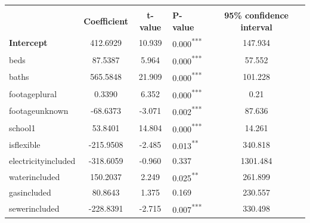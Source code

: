 \documentclass[12pt]{report}
\begin{document}
\renewcommand{\arraystretch}{0.5}
\begin{table}[H]
	\centering
	\begin{tabular}{l S[table-format=5.4] S[table-format=4.4] l S[table-format=4.4]}
		\toprule \\
		                                                 & \textbf{Coefficient} & \textbf{t-value} & \textbf{P-value}           & \textbf{95\% confidence interval} \\ \midrule
		\textbf{Intercept}                               & 412.6929             & 10.939           & 0.000\textsuperscript{***} & 147.934                           \\
		beds                                             & 87.5387              & 5.964            & 0.000\textsuperscript{***} & 57.552                            \\
		baths                                            & 565.5848             & 21.909           & 0.000\textsuperscript{***} & 101.228                           \\
		footageplural                                    & 0.3390               & 6.352            & 0.000\textsuperscript{***} & 0.21                              \\
		footageunknown                                   & -68.6373             & -3.071           & 0.002\textsuperscript{***} & 87.636                            \\
		school1                                          & 53.8401              & 14.804           & 0.000\textsuperscript{***} & 14.261                            \\
		is\textunderscore flexible                       & -215.9508            & -2.485           & 0.013\textsuperscript{**}  & 340.818                           \\
		electricityincluded                              & -318.6059            & -0.960           & 0.337                      & 1301.484                          \\
		waterincluded                                    & 150.2037             & 2.249            & 0.025\textsuperscript{**}  & 261.899                           \\
		gasincluded                                      & 80.8643              & 1.375            & 0.169                      & 230.557                           \\
		sewerincluded                                    & -228.8391            & -2.715           & 0.007\textsuperscript{***} & 330.498                           \\

\end{tabular}
\end{table}
\end{document}
